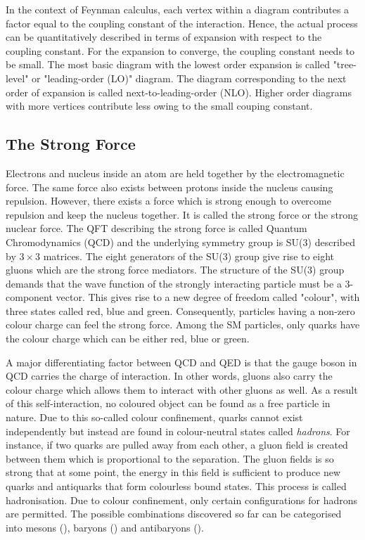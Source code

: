 In the context of Feynman calculus, each vertex within a diagram contributes a factor equal to the 
coupling constant of the interaction. Hence, the actual process can be quantitatively described in terms
of expansion with respect to the coupling constant. For the expansion to converge, the coupling constant
needs to be small. The most basic diagram with the lowest order expansion
is called "tree-level" or "leading-order (LO)" diagram. The diagram corresponding to the next order
of expansion is called next-to-leading-order (NLO). Higher order diagrams with more vertices 
contribute less owing to the small couping constant. 


\subsection{The Strong Force}
Electrons and nucleus inside an atom are held together by the electromagnetic force. The same 
force also exists between protons inside the nucleus causing repulsion. However, there exists a force
which is strong enough to overcome repulsion and keep the nucleus together. It is called the strong force or 
the strong nuclear force. The QFT describing the strong force is called Quantum Chromodynamics (QCD) and the
underlying symmetry group is SU(3) described by $3 \times 3$ matrices. The eight generators of the SU(3) group
give rise to eight gluons which are the strong force mediators. The structure of the SU(3) group demands that 
the wave function of the strongly interacting particle must be a 3-component vector. This gives rise to 
a new degree of freedom called "colour", with three states called red, blue and green. Consequently, particles
having a non-zero colour charge can feel the strong force. Among the SM particles, only quarks have the colour
charge which can be either red, blue or green.

A major differentiating factor between QCD and QED is that the gauge boson in QCD carries the charge of 
interaction. In other words, gluons also carry the colour charge which allows them to interact with other 
gluons as well. As a result of this self-interaction, no coloured object can be found as a free particle in 
nature. Due to this so-called colour confinement, quarks cannot exist independently but instead are found in
colour-neutral states called \textit{hadrons}. For instance, if two quarks are pulled away from each other, a gluon field is 
created between them which is proportional to the separation. The gluon fields is so strong that at some point,
the energy in this field is sufficient to produce new quarks and antiquarks that form colourless bound states.
This process is called hadronisation. Due to colour confinement, only certain configurations for hadrons
are permitted. The possible combinations discovered so far can be categorised into mesons (\Pquark\APquark),
baryons (\Pquark\Pquark\Pquark) and antibaryons (\APquark\APquark\APquark).


